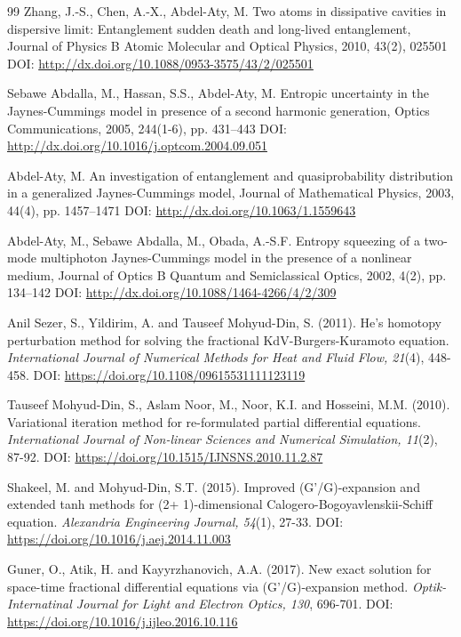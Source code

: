 \documentclass[10pt]{NSP1}
\numberwithin{equation}{section}
\begin{document}
\begin{thebibliography}{99}
 Zhang, J.-S., Chen, A.-X., Abdel-Aty, M.
Two atoms in dissipative cavities in dispersive limit: Entanglement sudden death and long-lived entanglement, Journal of Physics B Atomic Molecular and Optical Physics, 2010, 43(2), 025501 DOI: \url{http://dx.doi.org/10.1088/0953-3575/43/2/025501}

 Sebawe Abdalla, M., Hassan, S.S., Abdel-Aty, M.
Entropic uncertainty in the Jaynes-Cummings model in presence of a second harmonic generation, Optics Communications, 2005, 244(1-6), pp. 431--443 DOI: \url{http://dx.doi.org/10.1016/j.optcom.2004.09.051}

 Abdel-Aty, M.
An investigation of entanglement and quasiprobability distribution in a generalized Jaynes-Cummings model, Journal of Mathematical Physics, 2003, 44(4), pp. 1457--1471 DOI: \url{http://dx.doi.org/10.1063/1.1559643}

 Abdel-Aty, M., Sebawe Abdalla, M., Obada, A.-S.F.
Entropy squeezing of a two-mode multiphoton Jaynes-Cummings model in the presence of a nonlinear medium, Journal of Optics B Quantum and Semiclassical Optics, 2002, 4(2), pp. 134--142 DOI: \url{http://dx.doi.org/10.1088/1464-4266/4/2/309}

 Anil Sezer, S., Yildirim, A. and Tauseef Mohyud-Din, S. (2011). He's homotopy perturbation method for solving the fractional KdV-Burgers-Kuramoto equation. \emph{International Journal of Numerical Methods for Heat and Fluid Flow, 21}(4), 448-458. DOI: \url{https://doi.org/10.1108/09615531111123119}

 Tauseef Mohyud-Din, S., Aslam Noor, M., Noor, K.I. and Hosseini, M.M. (2010). Variational iteration method for re-formulated partial differential equations. \emph{International Journal of Non-linear Sciences and Numerical Simulation, 11}(2), 87-92. DOI: \url{https://doi.org/10.1515/IJNSNS.2010.11.2.87}

 Shakeel, M. and Mohyud-Din, S.T. (2015). Improved (G'/G)-expansion and extended tanh methods for (2+ 1)-dimensional Calogero-Bogoyavlenskii-Schiff equation. \emph{Alexandria Engineering Journal, 54}(1), 27-33. DOI: \url{https://doi.org/10.1016/j.aej.2014.11.003}

 Guner, O., Atik, H. and Kayyrzhanovich, A.A. (2017). New exact solution for space-time fractional differential equations via (G'/G)-expansion method. \emph{Optik-Internatinal Journal for Light and Electron Optics, 130}, 696-701. DOI: \url{https://doi.org/10.1016/j.ijleo.2016.10.116}


\end{thebibliography}
\end{document}

